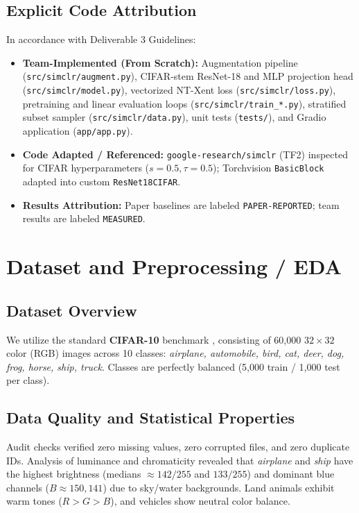 \documentclass[conference]{IEEEtran}
\begin{document}
\subsection{Explicit Code Attribution}
In accordance with Deliverable 3 Guidelines:
\begin{itemize}
    \item \textbf{Team-Implemented (From Scratch):} Augmentation pipeline (\texttt{src/simclr/augment.py}), CIFAR-stem ResNet-18 and MLP projection head (\texttt{src/simclr/model.py}), vectorized NT-Xent loss (\texttt{src/simclr/loss.py}), pretraining and linear evaluation loops (\texttt{src/simclr/train\_*.py}), stratified subset sampler (\texttt{src/simclr/data.py}), unit tests (\texttt{tests/}), and Gradio application (\texttt{app/app.py}).
    \item \textbf{Code Adapted / Referenced:} \texttt{google-research/simclr} (TF2) inspected for CIFAR hyperparameters ($s=0.5, \tau=0.5$); Torchvision \texttt{BasicBlock} adapted into custom \texttt{ResNet18CIFAR}.
    \item \textbf{Results Attribution:} Paper baselines are labeled \texttt{PAPER-REPORTED}; team results are labeled \texttt{MEASURED}.
\end{itemize}

\section{Dataset and Preprocessing / EDA}
\subsection{Dataset Overview}
We utilize the standard \textbf{CIFAR-10} benchmark \cite{krizhevsky2009learning}, consisting of 60,000 $32 \times 32$ color (RGB) images across 10 classes: \textit{airplane, automobile, bird, cat, deer, dog, frog, horse, ship, truck}. Classes are perfectly balanced (5,000 train / 1,000 test per class).

\subsection{Data Quality and Statistical Properties}
Audit checks verified zero missing values, zero corrupted files, and zero duplicate IDs. Analysis of luminance and chromaticity revealed that \textit{airplane} and \textit{ship} have the highest brightness (medians $\approx 142/255$ and $133/255$) and dominant blue channels ($B \approx 150, 141$) due to sky/water backgrounds. Land animals exhibit warm tones ($R > G > B$), and vehicles show neutral color balance.
\end{document}
